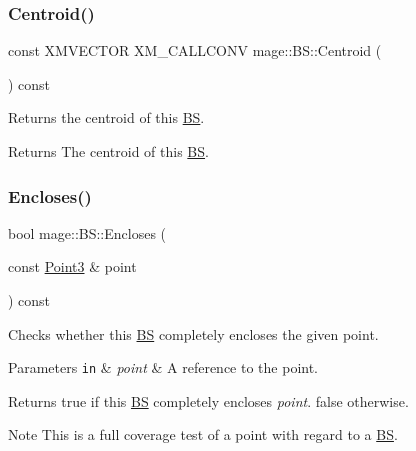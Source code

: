 \subsubsection{\texorpdfstring{Centroid()}{Centroid()}}
{\footnotesize\ttfamily const X\+M\+V\+E\+C\+T\+OR X\+M\+\_\+\+C\+A\+L\+L\+C\+O\+NV mage\+::\+B\+S\+::\+Centroid (\begin{DoxyParamCaption}{ }\end{DoxyParamCaption}) const\hspace{0.3cm}{\ttfamily [noexcept]}}

Returns the centroid of this \hyperlink{classmage_1_1_b_s}{BS}.

\begin{DoxyReturn}{Returns}
The centroid of this \hyperlink{classmage_1_1_b_s}{BS}. 
\end{DoxyReturn}
\hypertarget{classmage_1_1_b_s_a0050f2e110b107ae98bb9f33e3386758}{}\label{classmage_1_1_b_s_a0050f2e110b107ae98bb9f33e3386758} 
\subsubsection{\texorpdfstring{Encloses()}{Encloses()}\hspace{0.1cm}{\footnotesize\ttfamily [1/4]}}
{\footnotesize\ttfamily bool mage\+::\+B\+S\+::\+Encloses (\begin{DoxyParamCaption}\item[{const \hyperlink{structmage_1_1_point3}{Point3} \&}]{point }\end{DoxyParamCaption}) const\hspace{0.3cm}{\ttfamily [noexcept]}}

Checks whether this \hyperlink{classmage_1_1_b_s}{BS} completely encloses the given point.


\begin{DoxyParams}[1]{Parameters}
\mbox{\tt in}  & {\em point} & A reference to the point. \\
\hline
\end{DoxyParams}
\begin{DoxyReturn}{Returns}
{\ttfamily true} if this \hyperlink{classmage_1_1_b_s}{BS} completely encloses {\itshape point}. {\ttfamily false} otherwise. 
\end{DoxyReturn}
\begin{DoxyNote}{Note}
This is a full coverage test of a point with regard to a \hyperlink{classmage_1_1_b_s}{BS}. 
\end{DoxyNote}
\hypertarget{classmage_1_1_b_s_ac19027d3c6e70b0bd626f579434dbcf2}{}\label{classmage_1_1_b_s_ac19027d3c6e70b0bd626f579434dbcf2} 
